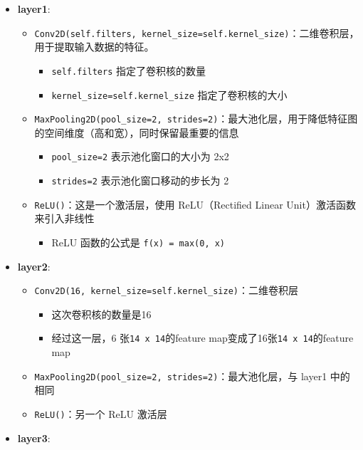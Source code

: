 \documentclass[12pt,a4paper]{article}
\begin{document}
\begin{itemize}
\item
  \textbf{layer1}:

  \begin{itemize}
  \item
    \texttt{Conv2D(self.filters,\ kernel\_size=self.kernel\_size)}：二维卷积层，用于提取输入数据的特征。

    \begin{itemize}
    \item
      \texttt{self.filters} 指定了卷积核的数量
    \item
      \texttt{kernel\_size=self.kernel\_size} 指定了卷积核的大小
    \end{itemize}
  \item
    \texttt{MaxPooling2D(pool\_size=2,\ strides=2)}：最大池化层，用于降低特征图的空间维度（高和宽），同时保留最重要的信息

    \begin{itemize}
    \item
      \texttt{pool\_size=2} 表示池化窗口的大小为 2x2
    \item
      \texttt{strides=2} 表示池化窗口移动的步长为 2
    \end{itemize}
  \item
    \texttt{ReLU()}：这是一个激活层，使用 ReLU（Rectified Linear
    Unit）激活函数来引入非线性

    \begin{itemize}
    \item
      ReLU 函数的公式是 \texttt{f(x)\ =\ max(0,\ x)}
    \end{itemize}
  \end{itemize}
\item
  \textbf{layer2}:

  \begin{itemize}
  \item
    \texttt{Conv2D(16,\ kernel\_size=self.kernel\_size)}：二维卷积层

    \begin{itemize}
    \item
      这次卷积核的数量是16
    \item
      经过这一层，6 张\texttt{14\ x\ 14}的feature
      map变成了16张\texttt{14\ x\ 14}的feature map
    \end{itemize}
  \item
    \texttt{MaxPooling2D(pool\_size=2,\ strides=2)}：最大池化层，与
    layer1 中的相同
  \item
    \texttt{ReLU()}：另一个 ReLU 激活层
  \end{itemize}
\item
  \textbf{layer3}:


\end{itemize}
\end{document}
